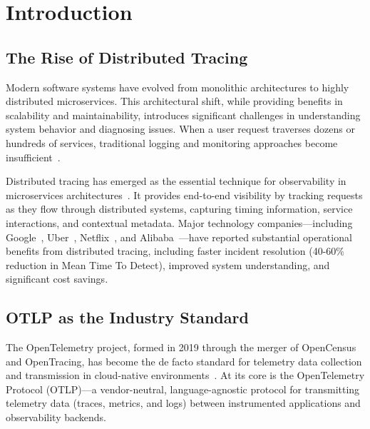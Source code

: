 
\section{Introduction}
\label{sec:introduction}

\subsection{The Rise of Distributed Tracing}
\label{sec:rise-tracing}

Modern software systems have evolved from monolithic architectures to highly distributed microservices. This architectural shift, while providing benefits in scalability and maintainability, introduces significant challenges in understanding system behavior and diagnosing issues. When a user request traverses dozens or hundreds of services, traditional logging and monitoring approaches become insufficient~\cite{sigelman2010dapper}.

Distributed tracing has emerged as the essential technique for observability in microservices architectures~\cite{sambasivan2016principled,kaldor2017canopy}. It provides end-to-end visibility by tracking requests as they flow through distributed systems, capturing timing information, service interactions, and contextual metadata. Major technology companies—including Google~\cite{sigelman2010dapper}, Uber~\cite{uber2016jaeger}, Netflix~\cite{netflix2017edda}, and Alibaba~\cite{alibaba2018eagleeye}—have reported substantial operational benefits from distributed tracing, including faster incident resolution (40-60\% reduction in Mean Time To Detect), improved system understanding, and significant cost savings.

\subsection{OTLP as the Industry Standard}
\label{sec:otlp-standard}

The OpenTelemetry project, formed in 2019 through the merger of OpenCensus and OpenTracing, has become the de facto standard for telemetry data collection and transmission in cloud-native environments~\cite{opentelemetry2023}. At its core is the OpenTelemetry Protocol (OTLP)—a vendor-neutral, language-agnostic protocol for transmitting telemetry data (traces, metrics, and logs) between instrumented applications and observability backends.

